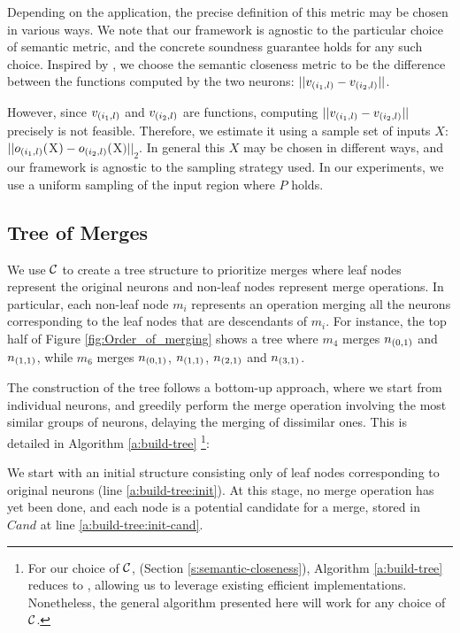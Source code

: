 Depending on the application, the precise definition of this metric may be
chosen in various ways. We note that our framework is agnostic to the particular
choice of semantic metric, and the concrete soundness guarantee holds for any such
choice. Inspired by \cite{deep-abstract}, we choose the
semantic closeness metric to be the difference between the functions computed 
by the two neurons: $||v_{(i_1,l)} - v_{(i_2,l)}||$. 

However, since $v_{(i_1,l)}$ and $v_{(i_2,l)}$ are functions, computing
$||v_{(i_1,l)} - v_{(i_2,l)}||$ precisely is not feasible.
Therefore, we estimate it using a sample set of inputs $X$: $||o_{(i_1,l)}($X$)
- o_{(i_2,l)}($X$)||_2$. In general this $X$ may be chosen in different ways,
and our framework is agnostic to the sampling strategy used. In our experiments,
we use a uniform sampling of the input region where $P$ holds.

\subsection{Tree of Merges}
\label{s:tree}

We use $\mathcal{C}$ to create a tree structure to prioritize merges where leaf nodes
represent the original neurons and non-leaf nodes represent merge operations. In
particular, each non-leaf node $m_i$ represents an operation merging all the neurons
corresponding to the leaf nodes that are descendants of $m_i$. For instance, 
the top half of Figure \ref{fig:Order_of_merging} shows a tree where $m_4$
merges $n_{(0,1)}$ and $n_{(1,1)}$, while $m_6$ merges $n_{(0,1)}$,
$n_{(1,1)}$, $n_{(2,1)}$ and $n_{(3,1)}$.

The construction of the tree follows a bottom-up approach, where we start from
individual neurons, and greedily perform the merge operation involving the most
similar groups of neurons, delaying the merging of dissimilar ones. This is
detailed in Algorithm \ref{a:build-tree} \footnote{ 
For our choice of $\mathcal{C}$, (Section \ref{s:semantic-closeness}), Algorithm
\ref{a:build-tree} reduces to \hcluster, allowing us to leverage existing
efficient implementations. Nonetheless, the
general algorithm presented here will work for any choice of $\mathcal{C}$.}:

We start with an initial structure
consisting only of leaf nodes corresponding to original neurons (line
\ref{a:build-tree:init}). At
this stage, no merge operation has yet been done, and each node is a potential
candidate for a merge, stored in $\mathit{Cand}$ at line
\ref{a:build-tree:init-cand}.

